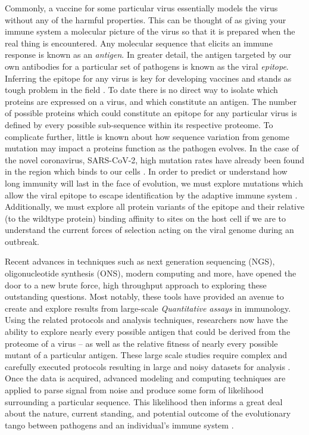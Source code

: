 \documentclass{article}
\begin{document}
Commonly, a vaccine for some particular virus essentially models the virus without any of the harmful properties.
This can be thought of as giving your immune system a molecular picture of the virus so that it is prepared when the real thing is encountered.
Any molecular sequence that elicits an immune response is known as an \textit{antigen}.
In greater detail, the antigen targeted by our own antibodies for a particular set of pathogens is known as the viral \textit{epitope}.
Inferring the epitope for any virus is key for developing vaccines and stands as tough problem in the field \citep{Stoddard2020}.
To date there is no direct way to isolate which proteins are expressed on a virus, and which constitute an antigen.
The number of possible proteins which could constitute an epitope for any particular virus is defined by every possible sub-sequence within its respective proteome.
To complicate further, little is known about how sequence variation from genome mutation may impact a proteins function as the pathogen evolves.
In the case of the novel coronavirus, SARS-CoV-2, high mutation rates have already been found in the region which binds to our cells \citep{Garrett2020, Starr2020}.
In order to predict or understand how long immunity will last in the face of evolution, we must explore mutations which allow the viral epitope to escape identification by the adaptive immune system \citep{Garrett2020}.
Additionally, we must explore all protein variants of the epitope and their relative (to the wildtype protein) binding affinity to sites on the host cell if we are to understand the current forces of selection acting on the viral genome during an outbreak.

Recent advances in techniques such as next generation sequencing (NGS), oligonucleotide synthesis (ONS), modern computing and more, have opened the door to a new brute force, high throughput approach to exploring these outstanding questions.
Most notably, these tools have provided an avenue to create and explore results from large-scale \textit{Quantitative assays} in immunology.
Using the related protocols and analysis techniques, researchers now have the ability to explore nearly every possible antigen that could be derived from the proteome of a virus -- as well as the relative fitness of nearly every possible mutant of a particular antigen.
These large scale studies require complex and carefully executed protocols resulting in large and noisy datasets for analysis \citep{Mohan2018, Bloom2014, Shrock2020}.
Once the data is acquired, advanced modeling and computing techniques are applied to parse signal from noise and produce some form of likelihood surrounding a particular sequence.
This likelihood then informs a great deal about the nature, current standing, and potential outcome of the evolutionary tango between pathogens and an individual's immune system \citep{Garrett2020}.
\end{document}
